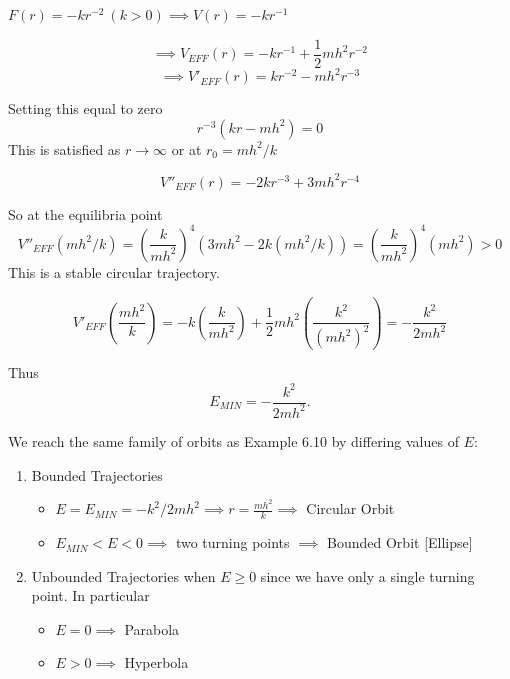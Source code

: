\documentclass[twoside]{scrartcl}
\begin{document}
\begin{example}
	$F(r) = -kr^{-2} ~(k > 0) \implies V(r) = -kr^{-1}$
	
	 \[\implies V_{EFF}(r) = -kr^{-1} + \frac{1}{2}mh^2r^{-2}\] 
	 \[\implies V'_{EFF}(r) = kr^{-2} - mh^2r^{-3}\]
	 
	 Setting this equal to zero 
	 \[r^{-3}(kr -mh^2) = 0\]
	 This is satisfied as $r \to \infty$ or at $r_0 = mh^2/k$
	 
	 \[V''_{EFF}(r) = -2kr^{-3} + 3mh^2r^{-4}\]
	 
	 So at the equilibria point
	 \[V''_{EFF}(mh^2/k) = \left(\frac{k}{mh^2}\right)^4(3mh^2 - 2k(mh^2/k)) = \left(\frac{k}{mh^2}\right)^4(mh^2)  > 0\]
	 This is a stable circular trajectory.
	 
  \begin{center}
  \end{center}
  
  	 
\[ V'_{EFF}(\frac{mh^2}{k}) = -k\left(\frac{k}{mh^2}\right) + \frac{1}{2}mh^2\left(\frac{k^2}{(mh^2)^2}\right) = -\frac{k^2}{2mh^2}\] 

Thus \[E_{MIN} = -\frac{k^2}{2mh^2}.\]


We reach the same family of orbits as Example 6.10 by differing values of $E$:
\begin{enumerate}
\item Bounded Trajectories
\begin{itemize}
\item $E = E_{MIN} = -k^2/2mh^2 \implies r = \frac{mh^2}{k} \implies$ Circular Orbit
\item $E_{MIN} < E < 0 \implies $ two turning points $\implies$ Bounded Orbit [Ellipse]

\end{itemize}

\item Unbounded Trajectories when $E \geq 0$ since we have only a single turning point. In particular
\begin{itemize}
\item $E = 0 \implies $ Parabola
\item $E > 0 \implies $ Hyperbola
\end{itemize}

\end{enumerate}
\end{example}
\end{document}
